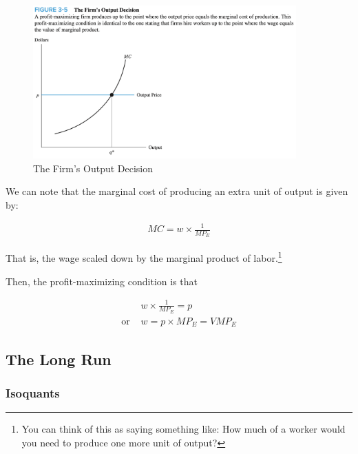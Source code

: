\FloatBarrier

\begin{figure}[!htb]
    \centering
        \includegraphics[width=0.9\textwidth]{../input/ch_3p2_mc_firm_output.png}
    \caption{The Firm's Output Decision}
    \label{fig:ch_3p2_mc_firm_output}
\end{figure}

\FloatBarrier

We can note that the 
marginal cost of 
producing an extra unit of output is given by:

\begin{align}
    M C=w \times \frac{1}{M P_E}
\end{align}

That is, the wage scaled down by 
the marginal product of labor.\footnote{You can think of 
this as saying something like: How much of a worker would you 
need to produce one more unit of output?}

Then, the profit-maximizing 
condition is that

\begin{align}
    &w \times \frac{1}{M P_E}=p \\
    \text{or } &w=p \times M P_E = V M P_E
\end{align}

\subsection{The Long Run}

\subsubsection{Isoquants}

